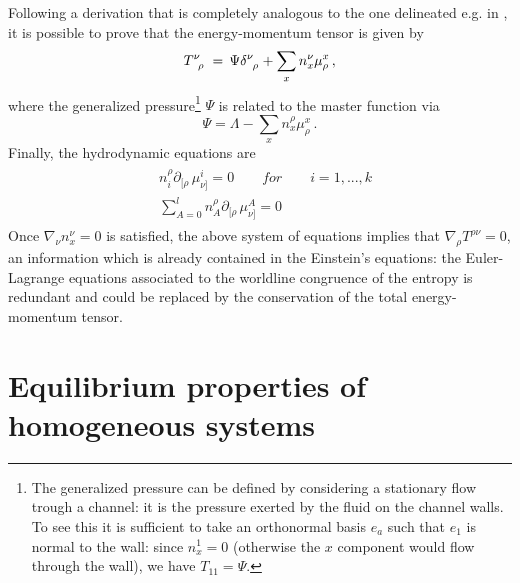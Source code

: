 \documentclass[usenatbib]{mnras}
\begin{document}
Following a derivation that is completely analogous to the one delineated e.g. in \cite{andersson2007review}, it is possible to prove that the energy-momentum tensor is given by
%
\begin{equation}
\label{energiamomentotempfinita}
T\indices{^\nu _\rho} \, = \, \Psi \delta\indices{^\nu _\rho} + \sum_x n^\nu_x \mu_{\rho}^x \, ,
\end{equation}
%
where the generalized pressure\footnote{
The generalized pressure can be defined by considering a stationary flow trough a channel: it is the pressure exerted by the fluid on the channel walls. To see this it is sufficient to take an orthonormal basis $e_a$ such that $e_1$ is normal to the wall: since $n_x^1=0$ (otherwise the $x$ component would flow through the wall), we have $T_{11}=\Psi$.} $\Psi$ is related to the master function via
%
\begin{equation}\label{pressionciona}
\Psi = \Lambda - \sum_x n^\rho_x \mu_{\rho}^x \, .
\end{equation}
%
Finally, the hydrodynamic equations are
%
\begin{align}
\begin{split}
& n_{i}^\rho \partial_{[\rho}  \, \mu_{ \nu]}^i = 0  \qquad for \qquad i=1,...,k
\\
&   \sum_{A=0}^l  n_{A}^\rho \partial_{[\rho}  \, \mu_{ \nu]}^A = 0 
\end{split}
\label{equationsofmotioningeneral}
\end{align} 
%
Once $\nabla_\nu n_x^\nu=0$ is satisfied, the above system of equations implies that $\nabla_\rho T^{\rho \nu}=0$, an information which is already contained in the Einstein's equations: the Euler-Lagrange equations associated to the worldline congruence of the entropy is  redundant and could be replaced by the conservation of the total energy-momentum tensor. 



\section{Equilibrium properties of homogeneous systems}
\label{Equilibrium properties of homogeneous systems}

%
\end{document}
